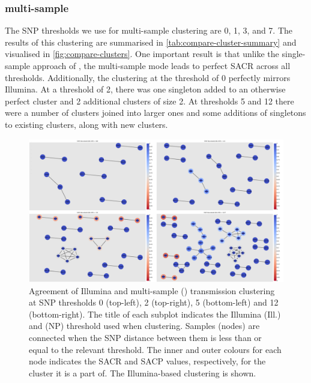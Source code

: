 \subsubsection{\pandora{} multi-sample}

The SNP thresholds we use for \pandora{} multi-sample clustering are 0, 1, 3, and 7. The results of this clustering are summarised in \autoref{tab:compare-cluster-summary} and visualised in \autoref{fig:compare-clusters}. One important result is that unlike the single-sample approach of \pandora{}, the multi-sample mode leads to perfect SACR across all thresholds. Additionally, the clustering at the threshold of 0 perfectly mirrors Illumina. At a threshold of 2, there was one singleton added to an otherwise perfect cluster and 2 additional clusters of size 2. At thresholds 5 and 12 there were a number of clusters joined into larger ones and some additions of singletons to existing clusters, along with new clusters.

\begin{figure}
\begin{center}
\includegraphics[width=0.90\columnwidth]{Chapter2/Figs/pandora_compare_clusters.png}
\caption{{Agreement of Illumina and \pandora{} multi-sample (\ont{}) transmission clustering at SNP
thresholds 0 (top-left), 2 (top-right), 5 (bottom-left) and 12 (bottom-right). The title of
each subplot indicates the Illumina (Ill.) and \ont{} (NP) threshold
used when clustering. Samples (nodes) are connected when the SNP
distance between them is less than or equal to the relevant threshold.
The inner and outer colours for each node indicates the SACR and SACP
values, respectively, for the cluster it is a part of. The
Illumina-based clustering is shown.
{\label{fig:compare-clusters}}%
}}
\end{center}
\end{figure}

